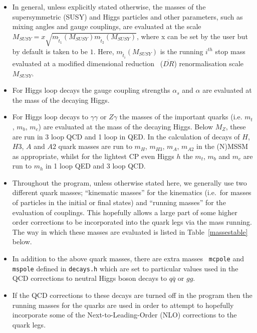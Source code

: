 \documentclass[final,3p,times,pdflatex]{elsarticle}
\begin{document}
\begin{itemize}
\item In general, unless explicitly stated otherwise, the masses of the
  supersymmetric (SUSY) and Higgs particles and other parameters, such as
  mixing angles and gauge couplings, are evaluated at the scale $M_{SUSY} =
  x\sqrt{m_{\tilde{t}_1}(M_{SUSY})m_{\tilde{t}_2}(M_{SUSY})}$, where x can be
  set by the user but by default is taken to be $1$. Here,
  $m_{\tilde{t}_i}(M_{SUSY})$ is the running $i^{th}$ stop mass evaluated at
  a modified dimensional reduction~\cite{Jones:1994} ($\overline{DR}$) renormalisation scale
  $M_{SUSY}$.  
\item For Higgs loop decays the gauge coupling strengths $\alpha_s$ and $\alpha$ are evaluated at the mass of the decaying Higgs.
\item For Higgs loop decays to $\gamma\gamma$ or $Z\gamma$ the masses of the
 important  quarks (i.e. $m_{t}$, $m_{b}$,  $m_{c}$) are evaluated at
 the mass of the decaying Higgs. Below $M_Z$, these are run in 3 loop
 QCD and 1 loop in QED\@. 
In the calculation of decays of $H$, $H3$, $A$ and $A2$ quark masses  are run
to $m_H$, $m_{H3}$, $m_{A}$, $m_{A2}$ 
in the (N)MSSM as appropriate, whilst for the lightest CP even Higgs $h$ the
$m_{t}$, $m_{b}$ and $m_{c}$ are run to $m_h$ in 1 loop QED and 3 loop QCD. 
\item Throughout the program, unless otherwise stated here, we generally use two
  different quark masses; ``kinematic masses'' for the kinematics (i.e.\ for
  masses of particles in the initial or final states) and ``running masses''
  for the evaluation of couplings.  This hopefully allows a large part of some
  higher order  corrections 
  to be incorporated into the quark legs via the mass
  running. The way in which these masses are evaluated is listed in Table~\ref{massestable} below. 
\item In addition to the above quark masses, there are extra masses {\tt
    mcpole} and {\tt mspole} defined in {\tt decays.h} which are set
  to particular values used in the QCD corrections to neutral
  Higgs boson decays to $q \bar{q}$ or $gg$. 
\item If the QCD corrections to these decays are turned off in the program then
  the running masses for the quarks are used in order to attempt to hopefully
  incorporate some of the Next-to-Leading-Order (NLO) corrections to the quark
  legs. 
\end{itemize}
\end{document}
